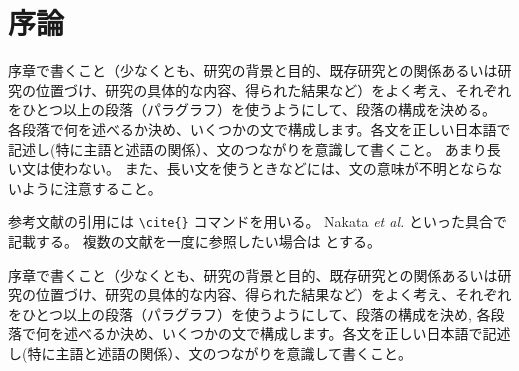 \setcounter{chapter}{0}
\chapter{序論}
序章で書くこと（少なくとも、研究の背景と目的、既存研究との関係あるいは研究の位置づけ、研究の具体的な内容、得られた結果など）をよく考え、それぞれをひとつ以上の段落（パラグラフ）を使うようにして、段落の構成を決める。
各段落で何を述べるか決め、いくつかの文で構成します。各文を正しい日本語で記述し(特に主語と述語の関係）、文のつながりを意識して書くこと。
あまり長い文は使わない。
また、長い文を使うときなどには、文の意味が不明とならないように注意すること。

参考文献の引用には \verb|\cite{}| コマンドを用いる。
Nakata \textit{et al.} \cite{Nakata2003} といった具合で記載する。
複数の文献を一度に参照したい場合は \cite{Nakata2003,Fukuda2001} とする。


序章で書くこと（少なくとも、研究の背景と目的、既存研究との関係あるいは研究の位置づけ、研究の具体的な内容、得られた結果など）をよく考え、それぞれをひとつ以上の段落（パラグラフ）を使うようにして、段落の構成を決め, 各段落で何を述べるか決め、いくつかの文で構成します。各文を正しい日本語で記述し(特に主語と述語の関係）、文のつながりを意識して書くこと。
